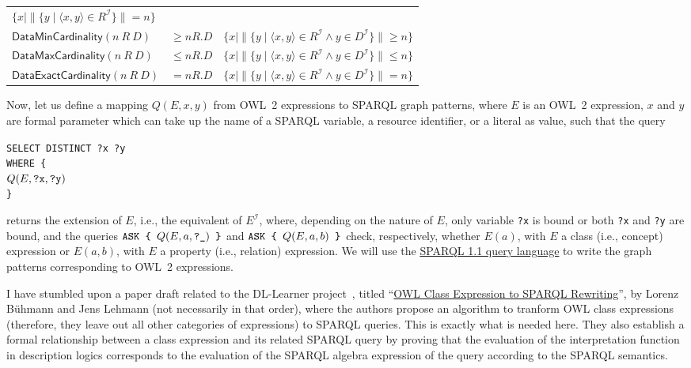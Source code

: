 \documentclass[a4paper]{article}
\newcounter{ex}
\begin{document}
\begin{table}
\begin{center}
\begin{tabular}{|l|l|l|}
    $\{x \mid \|\{y \mid \langle x, y\rangle \in R^\mathcal{I}\}\| = n\}$ \\
  $\mathsf{DataMinCardinality}(n\ R\ D)$ & $\geq nR.D$ &
    $\{x \mid \|\{y \mid \langle x, y\rangle \in R^\mathcal{I} \land y \in D^\mathcal{I}\}\| \geq n\}$ \\
  $\mathsf{DataMaxCardinality}(n\ R\ D)$ & $\leq nR.D$ &
    $\{x \mid \|\{y \mid \langle x, y\rangle \in R^\mathcal{I} \land y \in D^\mathcal{I}\}\| \leq n\}$ \\
  $\mathsf{DataExactCardinality}(n\ R\ D)$ & $=nR.D$ &
    $\{x \mid \|\{y \mid \langle x, y\rangle \in R^\mathcal{I} \land y \in D^\mathcal{I}\}\| = n\}$ \\
\hline
\end{tabular}
\end{center}
\end{table}

Now, let us define a mapping $Q(E, x, y)$ from OWL~2 expressions to SPARQL graph patterns,
where $E$ is an OWL~2 expression, $x$ and $y$ are formal parameter which can take up
the name of a SPARQL variable, a resource identifier, or a literal as value,
such that the query
\begin{tabbing}
\texttt{SELECT DISTINCT ?x ?y} \\
\texttt{WHERE \{}\\
\quad $Q(E, \mbox{\tt ?x}, \mbox{\tt ?y})$\\
\texttt{\}}
\end{tabbing}
returns the extension of $E$, i.e., the equivalent of $E^\mathcal{I}$, where,
depending on the nature of $E$, only variable \texttt{?x}
is bound or both \texttt{?x} and \texttt{?y} are bound,
and the queries $\mbox{\tt ASK \{ } Q(E, a, \mbox{\tt ?\_}) \mbox{\tt\ \}}$ and
$\mbox{\tt ASK \{ } Q(E, a, b) \mbox{\tt\ \}}$
check, respectively, whether $E(a)$, with $E$ a class (i.e., concept) expression or
$E(a, b)$, with $E$ a property (i.e., relation) expression.
We will use the \href{http://www.w3.org/TR/sparql11-query/}{SPARQL 1.1 query language}
to write the graph patterns corresponding to OWL~2 expressions.

I have stumbled upon a paper draft related to the DL-Learner project~\cite{Lehmann2009},
titled ``\href{http://svn.aksw.org/papers/2013/OWL_SPARQL/public.pdf}{OWL Class Expression
to SPARQL Rewriting}'', by Lorenz B\"uhmann and Jens Lehmann (not necessarily in that order),
where the authors propose
an algorithm to tranform OWL class expressions (therefore, they leave out all other
categories of expressions) to SPARQL queries. This is exactly what is needed here.
They also establish a formal relationship between a class expression and its related
SPARQL query by proving that the evaluation of the interpretation function in description logics
corresponds to the evaluation of the SPARQL algebra expression of the query according to
the SPARQL semantics.
\end{document}
